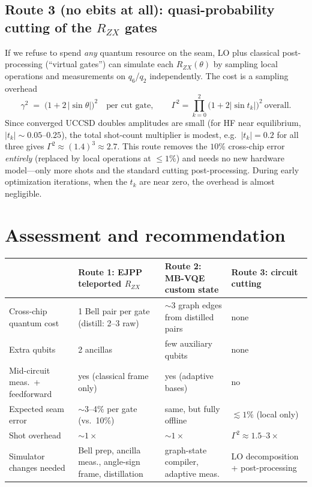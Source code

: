 \documentclass[11pt]{article}
\newcommand{\RZX}{R_{ZX}}
\begin{document}
\subsection{Route 3 (no ebits at all): quasi-probability cutting of the
$\RZX$ gates}

If we refuse to spend \emph{any} quantum resource on the seam, LO plus
classical post-processing (``virtual gates'') can simulate each
$\RZX(\theta)$ by sampling local operations and measurements on $q_6$/$q_2$
independently. The cost is a sampling overhead
\[
\gamma^2 \;=\; \big(1 + 2\,|\sin\theta|\big)^2 \quad \text{per cut gate},
\qquad
\Gamma^2 = \prod_{k=0}^{2}\big(1 + 2|\sin t_k|\big)^2 \ \text{overall}.
\]
Since converged UCCSD doubles amplitudes are small (for HF near equilibrium,
$|t_k| \sim 0.05$--$0.25$), the total shot-count multiplier is modest, e.g.\
$|t_k| = 0.2$ for all three gives $\Gamma^2 \approx (1.4)^3 \approx 2.7$.
This route removes the $10\%$ cross-chip error \emph{entirely} (replaced by
local operations at $\le 1\%$) and needs no new hardware model---only more
shots and the standard cutting post-processing. During early optimization
iterations, when the $t_k$ are near zero, the overhead is almost negligible.

\section{Assessment and recommendation}

\begin{center}
\begin{tabular}{p{3.4cm} p{3.5cm} p{3.5cm} p{3.6cm}}
\toprule
 & \textbf{Route 1: EJPP teleported $\RZX$} & \textbf{Route 2: MB-VQE custom state} & \textbf{Route 3: circuit cutting} \\
\midrule
Cross-chip quantum cost & 1 Bell pair per gate (distill: 2--3 raw) & $\sim$3 graph edges from distilled pairs & none \\
Extra qubits & 2 ancillas & few auxiliary qubits & none \\
Mid-circuit meas.\ + feedforward & yes (classical frame only) & yes (adaptive bases) & no \\
Expected seam error & $\sim$3--4\% per gate (vs.\ 10\%) & same, but fully offline & $\lesssim 1\%$ (local only) \\
Shot overhead & $\sim\!1\times$ & $\sim\!1\times$ & $\Gamma^2 \approx 1.5$--$3\times$ \\
Simulator changes needed & Bell prep, ancilla meas., angle-sign frame, distillation & graph-state compiler, adaptive meas. & LO decomposition + post-processing \\
\bottomrule
\end{tabular}
\end{center}
\end{document}
